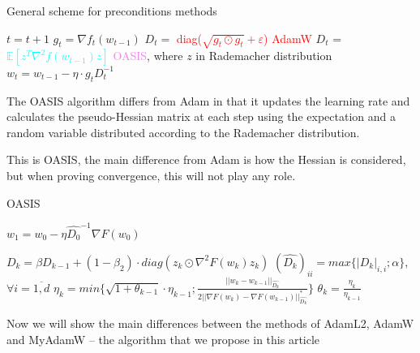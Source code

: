 \documentclass{article}
\begin{document}
\begin{algorithm}[H]
            
    \caption{General scheme for preconditions methods}\label{alg:genalg}

    \begin{algorithmic}
    \small{
    
    \State $t = t+1$
    \State $g_t = \nabla f_t(w_{t-1})$
    \State $D_t =$ \textcolor{red}{diag($\sqrt{g_t \odot g_t} + \varepsilon$)}  \hfill \textcolor{red}{AdamW}
    \State $D_t$ = \textcolor{cyan}{$\mathbb{E}[z^T \nabla^2f(w_{t-1}) z]$} \hfill \textcolor{violet}{OASIS}, where $z$ in Rademacher distribution
    \State $w_t = w_{t-1} - \eta \cdot g_t D_t^{-1}$    
    \EndWhile
    }
\end{algorithmic}
\end{algorithm}


The OASIS algorithm differs from Adam in that it updates the learning rate and calculates the pseudo-Hessian matrix at each step using the expectation and a random variable distributed according to the Rademacher distribution.

This is OASIS, the main difference from Adam is how the Hessian is considered, but when proving convergence, this will not play any role.
\begin{algorithm}[H]
\caption{OASIS}\label{alg:OASIS}
\begin{algorithmic}
    \State $w_1 = w_0 - \eta \hat{D_0}^{-1} \nabla F(w_0)$

    \State $D_k = \beta D_{k-1} + (1-\beta_2) \cdot diag\left( z_k \odot \nabla^2 F(w_k) z_k \right)$
    \State $(\hat{D_k})_{ii} = max \{|D_k|_{i, i} ; \alpha \}$, $\forall i = \overline{1, d}$
    \State $\eta_k = min \{ \sqrt{1 + \theta_{k-1}} \cdot \eta_{k-1}; \frac{||w_k - w_{k-1}||_{\hat{D_k}}}{2 ||\nabla F(w_k) - \nabla F(w_{k-1}) ||_{\hat{D_k}}^* } \}$
    \State $\theta_k = \frac{\eta_k}{\eta_{k-1}}$
    \EndFor
    
\end{algorithmic}
\end{algorithm}

Now we will show the main differences between the methods of AdamL2, AdamW and MyAdamW -- the algorithm that we propose in this article
\end{document}
